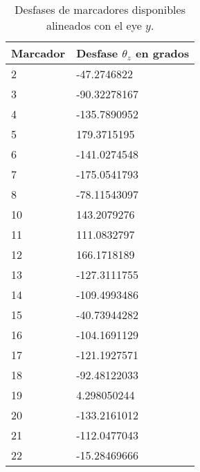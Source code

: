 \begin{table}[H]
	\centering
	\begin{tabular}{|l|l|}
		\hline
		\textbf{Marcador} & \textbf{Desfase  $\theta_z$ en grados} \\ \hline
		2 & -47.2746822 \\ \hline
		3 & -90.32278167 \\ \hline
		4 & -135.7890952 \\ \hline
		5 & 179.3715195 \\ \hline
		6 & -141.0274548 \\ \hline
		7 & -175.0541793 \\ \hline
		8 & -78.11543097 \\ \hline
		10 & 143.2079276 \\ \hline
		11 & 111.0832797 \\ \hline
		12 & 166.1718189 \\ \hline
		13 & -127.3111755 \\ \hline
		14 & -109.4993486 \\ \hline
		15 & -40.73944282 \\ \hline
		16 & -104.1691129 \\ \hline
		17 & -121.1927571 \\ \hline
		18 & -92.48122033 \\ \hline
		19 & 4.298050244 \\ \hline
		20 & -133.2161012 \\ \hline
		21 & -112.0477043 \\ \hline
		22 & -15.28469666 \\ \hline
	\end{tabular}
	\caption{Desfases de marcadores disponibles alineados con el eye $y$.}
	\label{cuadro:desfases_iniciales}
\end{table}

